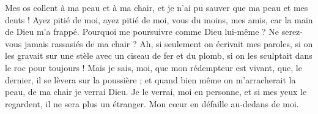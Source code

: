 Mes os collent à ma peau et à ma chair, et je n’ai pu sauver que ma peau et mes dents !
Ayez pitié de moi, ayez pitié de moi, vous du moins, mes amis, car la main de Dieu m’a frappé.
Pourquoi me poursuivre comme Dieu lui-même ? Ne serez-vous jamais rassasiés de ma chair ?
Ah, si seulement on écrivait mes paroles, si on les gravait sur une stèle
avec un ciseau de fer et du plomb, si on les sculptait dans le roc pour toujours !
Mais je sais, moi, que mon rédempteur est vivant, que, le dernier, il se lèvera sur la poussière ;
et quand bien même on m’arracherait la peau, de ma chair je verrai Dieu.
Je le verrai, moi en personne, et si mes yeux le regardent, il ne sera plus un étranger. Mon cœur en défaille au-dedans de moi.